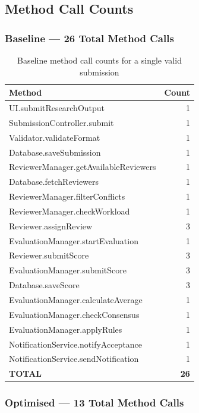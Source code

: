 \documentclass[12pt, a4paper]{article}
\begin{document}
\subsection{Method Call Counts}

\subsubsection{Baseline --- 26 Total Method Calls}

\begin{table}[H]
\centering
\caption{Baseline method call counts for a single valid submission}
\label{tab:baseline-calls}
\begin{tabular}{l r}
    \toprule
    \textbf{Method} & \textbf{Count} \\
    \midrule
    UI.submitResearchOutput & 1 \\
    SubmissionController.submit & 1 \\
    Validator.validateFormat & 1 \\
    Database.saveSubmission & 1 \\
    ReviewerManager.getAvailableReviewers & 1 \\
    Database.fetchReviewers & 1 \\
    ReviewerManager.filterConflicts & 1 \\
    ReviewerManager.checkWorkload & 1 \\
    Reviewer.assignReview & 3 \\
    EvaluationManager.startEvaluation & 1 \\
    Reviewer.submitScore & 3 \\
    EvaluationManager.submitScore & 3 \\
    Database.saveScore & 3 \\
    EvaluationManager.calculateAverage & 1 \\
    EvaluationManager.checkConsensus & 1 \\
    EvaluationManager.applyRules & 1 \\
    NotificationService.notifyAcceptance & 1 \\
    NotificationService.sendNotification & 1 \\
    \midrule
    \textbf{TOTAL} & \textbf{26} \\
    \bottomrule
\end{tabular}
\end{table}

\subsubsection{Optimised --- 13 Total Method Calls}
\end{document}
